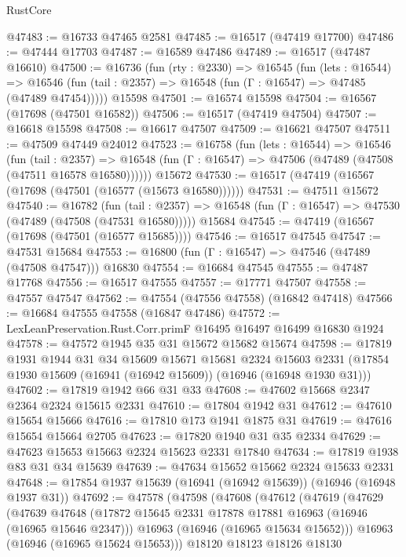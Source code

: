 \begin{lexlean}{RustCore}
\begin{coremodule}
@47483 := @16733 @47465 @2581
@47485 := @16517 (@47419 @17700)
@47486 := @47444 @17703
@47487 := @16589 @47486
@47489 := @16517 (@47487 @16610)
@47500 := @16736
    (fun (rty : @2330) =>
    @16545
      (fun (lets : @16544) =>
      @16546 (fun (tail : @2357) => @16548 (fun (Γ : @16547) => @47485 (@47489 @47454)))))
    @15598
@47501 := @16574 @15598
@47504 := @16567 (@17698 (@47501 @16582))
@47506 := @16517 (@47419 @47504)
@47507 := @16618 @15598
@47508 := @16617 @47507
@47509 := @16621 @47507
@47511 := @47509 @47449 @24012
@47523 := @16758
    (fun (lets : @16544) =>
    @16546
      (fun (tail : @2357) =>
      @16548 (fun (Γ : @16547) => @47506 (@47489 (@47508 (@47511 @16578 @16580))))))
    @15672
@47530 := @16517 (@47419 (@16567 (@17698 (@47501 (@16577 (@15673 @16580))))))
@47531 := @47511 @15672
@47540 := @16782
    (fun (tail : @2357) => @16548 (fun (Γ : @16547) => @47530 (@47489 (@47508 (@47531 @16580)))))
    @15684
@47545 := @47419 (@16567 (@17698 (@47501 (@16577 @15685))))
@47546 := @16517 @47545
@47547 := @47531 @15684
@47553 := @16800 (fun (Γ : @16547) => @47546 (@47489 (@47508 @47547))) @16830
@47554 := @16684 @47545
@47555 := @47487 @17768
@47556 := @16517 @47555
@47557 := @17771 @47507
@47558 := @47557 @47547
@47562 := @47554 (@47556 @47558) (@16842 @47418)
@47566 := @16684 @47555 @47558 (@16847 @47486)
@47572 := LexLeanPreservation.Rust.Corr.primF @16495 @16497 @16499 @16830 @1924
@47578 := @47572 @1945 @35 @31 @15672 @15682 @15674
@47598 := @17819
    @1931
    @1944
    @31
    @34
    @15609
    @15671
    @15681
    @2324
    @15603
    @2331
    (@17854 @1930 @15609 (@16941 (@16942 @15609)) (@16946 (@16948 @1930 @31)))
@47602 := @17819 @1942 @66 @31 @33
@47608 := @47602 @15668 @2347 @2364 @2324 @15615 @2331
@47610 := @17804 @1942 @31
@47612 := @47610 @15654 @15666
@47616 := @17810 @173 @1941 @1875 @31
@47619 := @47616 @15654 @15664 @2705
@47623 := @17820 @1940 @31 @35 @2334
@47629 := @47623 @15653 @15663 @2324 @15623 @2331 @17840
@47634 := @17819 @1938 @83 @31 @34 @15639
@47639 := @47634 @15652 @15662 @2324 @15633 @2331
@47648 := @17854 @1937 @15639 (@16941 (@16942 @15639)) (@16946 (@16948 @1937 @31))
@47692 := @47578
    (@47598
      (@47608
        (@47612
          (@47619
            (@47629
              (@47639
                @47648
                (@17872 @15645 @2331 @17878 @17881 @16963 (@16946 (@16965 @15646 @2347)))
                @16963
                (@16946 (@16965 @15634 @15652)))
              @16963
              (@16946 (@16965 @15624 @15653)))
            @18120
            @18123
            @18126
            @18130

\end{coremodule}
\end{lexlean}
